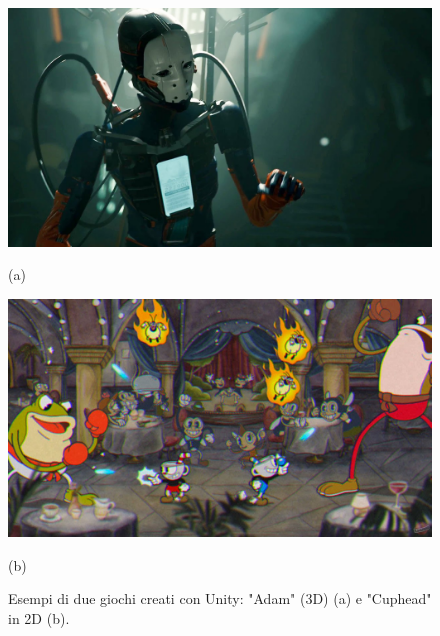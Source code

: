 \begin{figure}[t]
	\centering
	\begin{minipage}[b]{0.49\textwidth}
		\includegraphics[width=\textwidth]{figure/Adam}
		{\footnotesize \centerline{(a)} \par}
	\end{minipage}
	\hfill
	\begin{minipage}[b]{0.49\textwidth}
		\includegraphics[width=\textwidth]{figure/Cuphead}
		{\footnotesize \centerline{(b)} \par}
	\end{minipage}
	\caption{Esempi di due giochi creati con Unity: "Adam" (3D) \cite{UnityAdam} (a) e "Cuphead" in 2D \cite{Cuphead} (b).}
\end{figure}


